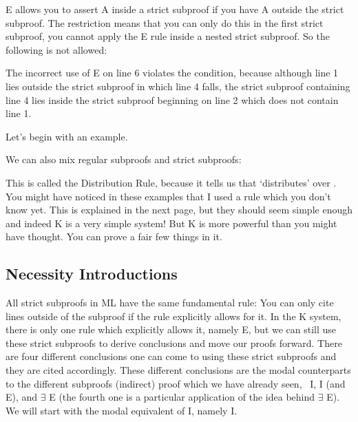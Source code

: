 \ebox E allows you to assert A inside a strict subproof if you have \ebox A outside the strict subproof. The restriction means that you can only do this in the first strict subproof, you cannot apply the \ebox E rule inside a nested strict subproof. So the following is not allowed:
\begin{fitchproof}
\open
{}
\open
{}	
		
\end{fitchproof}
The incorrect use of \ebox E on line 6 violates the condition, because although line 1 lies outside the strict subproof in which line 4 falls, the strict subproof containing line 4 lies inside the strict subproof beginning on line 2 which does not contain line 1.

Let’s begin with an example.
\begin{fitchproof}
\open
{}
\close
{}
\end{fitchproof}
We can also mix regular subproofs and strict subproofs:
\begin{fitchproof}
\open
{}
\open
{}
\close
{}
\close
{}	
\end{fitchproof}
This is called the Distribution Rule, because it tells us that \ebox  ‘distributes’ over \eif . You might have noticed in these examples that I used a rule which you don't know yet. This is explained in the next page, but they should seem simple enough and indeed K is a very simple system! But K is more powerful than you might have thought. You can prove a fair few things in it.
\subsection{Necessity Introductions}
All strict subproofs in ML have the same fundamental rule: You can only cite lines outside of the subproof if the rule explicitly allows for it. In the K system, there is only one rule which explicitly allows it, namely \ebox E, but we can still use these strict subproofs to derive conclusions and move our proofs forward. There are four different conclusions one can come to using these strict subproofs and they are cited accordingly. These different conclusions are the modal counterparts to the different subproofs (indirect) proof which we have already seen,  \eif I, \enot I (and \enot E), and $\exists$ E (the fourth one is a particular application of the idea behind $\exists$ E). We will start with the modal equivalent of \eif I, namely \ebox \eif I.

